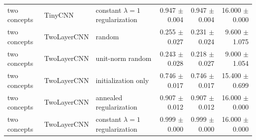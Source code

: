 {\begin{longtable}{p{.15\linewidth}p{.17\linewidth}p{.20\linewidth}rrr}
two concepts & TinyCNN & constant $\lambda=1$ regularization & 0.947 $\pm$ 0.004 & 0.947 $\pm$ 0.004 & 16.000 $\pm$ 0.000 \\
\addlinespace[2pt]
two concepts & TwoLayerCNN & random & 0.255 $\pm$ 0.027 & 0.231 $\pm$ 0.024 & 9.600 $\pm$ 1.075 \\
two concepts & TwoLayerCNN & unit-norm random & 0.243 $\pm$ 0.028 & 0.218 $\pm$ 0.027 & 9.000 $\pm$ 1.054 \\
two concepts & TwoLayerCNN & initialization only & 0.746 $\pm$ 0.017 & 0.746 $\pm$ 0.017 & 15.400 $\pm$ 0.699 \\
two concepts & TwoLayerCNN & annealed regularization & 0.907 $\pm$ 0.012 & 0.907 $\pm$ 0.012 & 16.000 $\pm$ 0.000 \\
two concepts & TwoLayerCNN & constant $\lambda=1$ regularization & 0.999 $\pm$ 0.000 & 0.999 $\pm$ 0.000 & 16.000 $\pm$ 0.000 \\
\end{longtable}
\normalsize
}